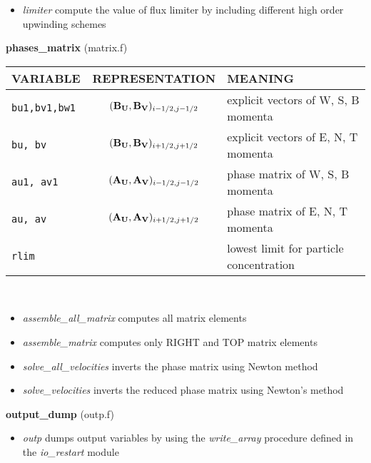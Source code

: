 \begin{itemize}
\item{\em limiter} compute the value of flux limiter by including different high order upwinding schemes
\end{itemize}
%
%
{\large{\bf phases\_matrix}} (matrix.f)\\[5mm]
\begin{tabular}{|p{6cm}|c|p{6cm}|}\hline
VARIABLE & REPRESENTATION & MEANING\\\hline
\tt bu1,bv1,bw1 & $({\bf B_U},{\bf B_V})_{i-1/2,j-1/2}$ & explicit vectors of W, S, B momenta\\\hline
\tt bu, bv & $({\bf B_U}, {\bf B_V})_{i+1/2,j+1/2}$ & explicit vectors of E, N, T momenta\\\hline
\tt au1, av1 &  $({\bf A_U}, {\bf A_V})_{i-1/2,j-1/2}$ & phase matrix of W, S, B momenta\\\hline
\tt au, av &  $({\bf A_U}, {\bf A_V})_{i+1/2,j+1/2}$ &phase matrix of E, N, T momenta\\\hline
\tt rlim && lowest limit for particle concentration \\\hline
\end{tabular}\\
\begin{itemize}
\item{\em assemble\_all\_matrix} computes all matrix elements\\
\item{\em assemble\_matrix} computes only RIGHT and TOP matrix elements\\
\item{\em solve\_all\_velocities} inverts the phase matrix using Newton method\\
\item{\em solve\_velocities} inverts the reduced phase matrix using Newton's method\\
\end{itemize}
%
%
{\large{\bf output\_dump}} (outp.f)\\
\begin{itemize}
\item{\em outp} dumps output variables by using the {\em write\_array} procedure defined in the {\em io\_restart}
 module
\end{itemize}
%
